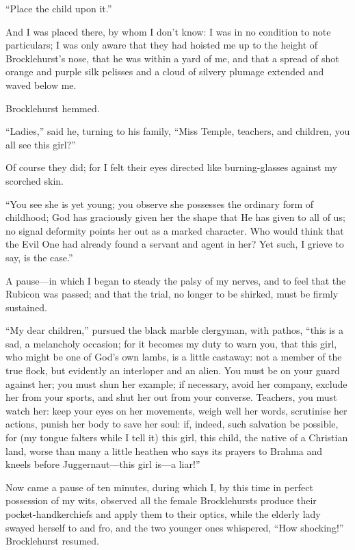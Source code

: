 \enquote{Place the child upon it.}

And I was placed there, by whom I don't know: I was in no condition to
note particulars; I was only aware that they had hoisted me up to the
height of \Mr{} Brocklehurst's nose, that he was within a yard of me, and
that a spread of shot orange and purple silk pelisses and a cloud of
silvery plumage extended and waved below me.

\Mr{} Brocklehurst hemmed.

\enquote{Ladies,} said he, turning to his family, \enquote{Miss Temple,
teachers, and children, you all see this girl?}

Of course they did; for I felt their eyes directed like burning-glasses
against my scorched skin.

\enquote{You see she is yet young; you observe she possesses the
ordinary form of childhood; God has graciously given her the shape that
He has given to all of us; no signal deformity points her out as a
marked character. Who would think that the Evil One had already found a
servant and agent in her? Yet such, I grieve to say, is the case.}

A pause---in which I began to steady the palsy of my nerves, and to feel
that the Rubicon was passed; and that the trial, no longer to be
shirked, must be firmly sustained.

\enquote{My dear children,} pursued the black marble clergyman, with
pathos, \enquote{this is a sad, a melancholy occasion; for it becomes my
duty to warn you, that this girl, who might be one of God's own lambs,
is a little castaway: not a member of the true flock, but evidently an
interloper and an alien. You must be on your guard against her; you
must shun her example; if necessary, avoid her company, exclude her from
your sports, and shut her out from your converse. Teachers, you must
watch her: keep your eyes on her movements, weigh well her words,
scrutinise her actions, punish her body to save her soul: if, indeed,
such salvation be possible, for (my tongue falters while I tell it) this
girl, this child, the native of a Christian land, worse than many a
little heathen who says its prayers to Brahma and kneels before
Juggernaut---this girl is---a liar!}

Now came a pause of ten minutes, during which I, by this time in perfect
possession of my wits, observed all the female Brocklehursts produce
their pocket-handkerchiefs and apply them to their optics, while the
elderly lady swayed herself to and fro, and the two younger ones
whispered, \enquote{How shocking!} \Mr{} Brocklehurst resumed.

